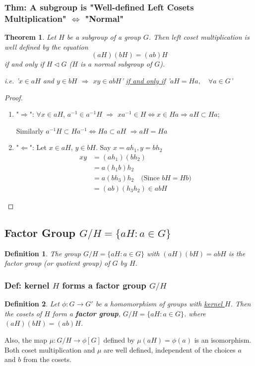 \documentclass[11pt,a4paper]{article}
\newtheorem{theorem}{Theorem}
\newtheorem{definition}{Definition}
\begin{document}
\subsubsection{Thm: A subgroup is "Well-defined Left Cosets Multiplication" $\Leftrightarrow$ "Normal"}
\begin{theorem}
    Let $H$ be a subgroup of a group $G$. Then left coset multiplication is well defined by the equation
    $$(aH)(bH) = (ab)H$$
    if and only if $H \lhd G$ ($H$ is a normal subgroup of $G$).

    i.e. '$x\in aH$ and $y\in bH$ $\Rightarrow$ $xy\in abH$' \underline{if and only if} '$aH=Ha,\quad \forall a\in G$'
\end{theorem}
\begin{proof}
    \quad

\begin{enumerate}[$\bullet$]
    \item "$\Rightarrow$": $\forall x\in aH$, $a^{-1}\in a^{-1}H$ $\Rightarrow$ $xa^{-1}\in H \Leftrightarrow x\in Ha \Rightarrow aH\subset Ha$;
    
    \quad Similarly $a^{-1}H\subset Ha^{-1} \Leftrightarrow	Ha\subset aH$ $\Rightarrow	aH=Ha$
    \item "$\Leftarrow$": Let $x\in aH$, $y\in bH$. Say $x=ah_1, y=bh_2$
    \begin{equation}
        \begin{aligned}
            xy&=(ah_1)(bh_2)\\
            &=a(h_1 b)h_2\\
            &=a(b h_3)h_2 \quad \text{(Since $bH=Hb$)}\\
            &=(ab)(h_3 h_2)\in abH
        \end{aligned}
        \nonumber
    \end{equation}
\end{enumerate}
\end{proof}


\subsection{Factor Group $G/H=\{aH:a\in G\}$}
\begin{definition}
    The group $G/H=\{aH:a\in G\}$ with $(aH)(bH)=abH$ is the factor group (or quotient group) of
    $G$ by $H$.
\end{definition}
\subsubsection{Def: kernel $H$ forms a factor group $G/H$}
\begin{definition}
    Let $\phi: G \rightarrow G'$ be a homomorphism of groups with \underline{kernel $H$}. Then the cosets of $H$ form
    a \textbf{factor group}, $G/H=\{aH:a\in G\}$. where $(aH)(bH) = (ab)H$.
\end{definition}
Also, the map $\mu: G/H \rightarrow \phi[G]$
    defined by $\mu(aH) = \phi(a)$ is an isomorphism. Both coset multiplication and $\mu$ are well
    defined, independent of the choices $a$ and $b$ from the cosets.
\end{document}

